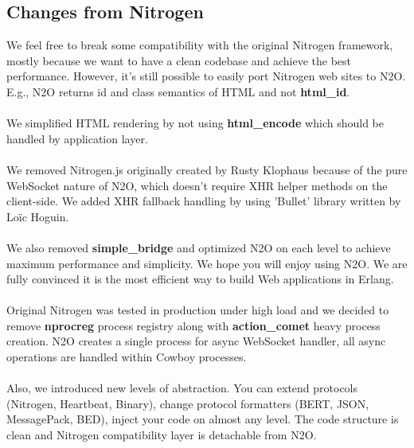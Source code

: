 \subsection*{Changes from Nitrogen}
We feel free to break some compatibility with the original
Nitrogen framework, mostly because we want to have a clean codebase
and achieve the best performance. However, it's still possible to easily port
Nitrogen web sites to N2O. E.g., N2O returns id and class semantics
of HTML and not {\bf html\_id}.

\paragraph{}
We simplified HTML rendering by not using
{\bf html\_encode} which should be handled by application layer.

\paragraph{}
We removed Nitrogen.js originally created by Rusty Klophaus
because of the pure WebSocket nature of N2O, which doesn't
require XHR helper methods on the client-side. We added XHR fallback
handling by using 'Bullet' library written by Loïc Hoguin.

\paragraph{}
We also removed {\bf simple\_bridge} and optimized N2O on each level to
achieve maximum performance and simplicity. We hope you will enjoy
using N2O. We are fully convinced it is the most efficient way to
build Web applications in Erlang.

\paragraph{}
Original Nitrogen was tested in production under high load and we
decided to remove {\bf nprocreg} process registry along
with {\bf{action\_comet}} heavy process creation. N2O creates a single
process for async WebSocket handler, all async operations
are handled within Cowboy processes.

\paragraph{}
Also, we introduced new levels of abstraction. You can extend
protocols (Nitrogen, Heartbeat, Binary), change protocol formatters (BERT,
JSON, MessagePack, BED), inject your code on almost any level. The code structure
is clean and Nitrogen compatibility layer is detachable from N2O.
